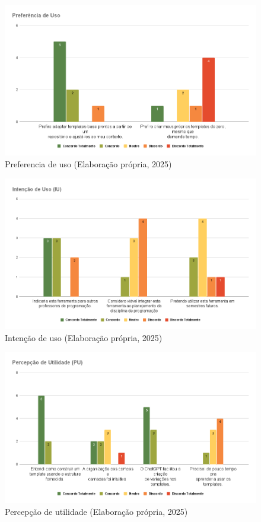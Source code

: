 \begin{figure}[ht]
	\centering
	\includegraphics[width=16cm]{./imagens/capitulo8/preferencia-uso}
	\caption{Preferencia de uso  (Elaboração própria, 2025) }
	\label{fig:preferencia-uso}
\end{figure}


\begin{figure}[ht]
	\centering
	\includegraphics[width=16cm]{./imagens/capitulo8/intencao-uso}
	\caption{Intenção de uso  (Elaboração própria, 2025) }
	\label{fig:intencao-uso}
\end{figure}



\begin{figure}[ht]
	\centering
	\includegraphics[width=16cm]{./imagens/capitulo8/percepcao-utilidade}
	\caption{Percepção de utilidade  (Elaboração própria, 2025) }
	\label{fig:percepcao-utilidade}
\end{figure}


